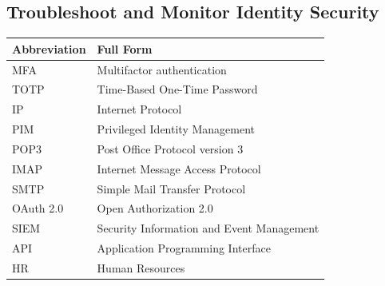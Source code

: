 \documentclass[10pt]{article}
\begin{document}
\clearpage
\subsection{Troubleshoot and Monitor Identity Security}

\begin{center}
\begin{tabular}{>{\raggedright\arraybackslash}p{} >{\raggedright\arraybackslash}p{}}
\toprule
\textbf{Abbreviation} & \textbf{Full Form} \\
\midrule
MFA & Multifactor authentication \\
TOTP & Time-Based One-Time Password \\
IP & Internet Protocol \\
PIM & Privileged Identity Management \\
POP3 & Post Office Protocol version 3 \\
IMAP & Internet Message Access Protocol \\
SMTP & Simple Mail Transfer Protocol \\
OAuth 2.0 & Open Authorization 2.0 \\
SIEM & Security Information and Event Management \\
API & Application Programming Interface \\
HR & Human Resources \\
\bottomrule
\end{tabular}
\end{center}
\end{document}
